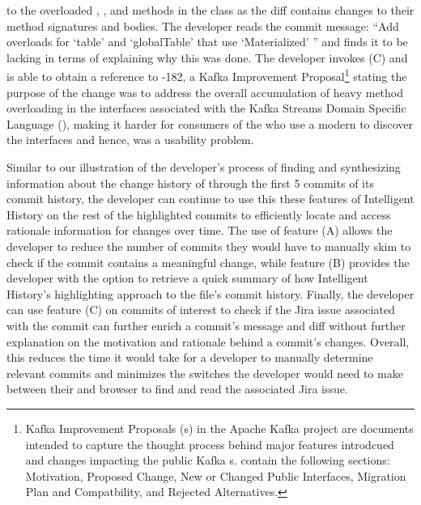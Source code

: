 to the overloaded , , and  methods in the  class as the diff contains changes to their method signatures and bodies.
The developer reads the commit message: ``Add overloads for `table' and `globalTable' that use `Materialized' '' and finds it to be lacking in terms of explaining why this was done.
The developer invokes (C) and is able to obtain a reference to -182, a Kafka Improvement Proposal\footnote{Kafka Improvement Proposals (s) in the Apache Kafka project are documents intended to capture the thought process behind major features introdcued and changes impacting the public Kafka s.  contain the following sections: Motivation, Proposed Change, New or Changed Public Interfaces, Migration Plan and Compatbility, and Rejected Alternatives.} stating the purpose of the change was to address the overall accumulation of heavy method overloading in the interfaces associated with the Kafka Streams Domain Specific Language (), making it harder for consumers of the  who use a modern  to discover the interfaces and hence, was a usability problem.

Similar to our illustration of the developer's process of finding and synthesizing information about the change history of  through the first 5 commits of its commit history, the developer can continue to use this these features of Intelligent History on the rest of the highlighted commits to efficiently locate and access rationale information for changes over time.
The use of feature (A) allows the developer to reduce the number of commits they would have to manually skim to check if the commit contains a meaningful change, while feature (B) provides the developer with the option to retrieve a quick summary of how Intelligent History's highlighting approach to the file's commit history.
Finally, the developer can use feature (C) on commits of interest to check if the Jira issue associated with the commit can further enrich a commit's message and diff without further explanation on the motivation and rationale behind a commit's changes.
Overall, this reduces the time it would take for a developer to manually determine relevant commits and minimizes the switches the developer would need to make between their  and browser to find and read the associated Jira issue.

\endinput

Any text after an \endinput is ignored.
You could put scraps here or things in progress.